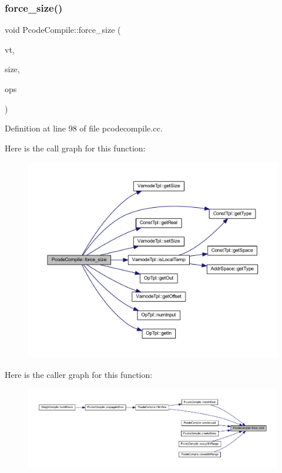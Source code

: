 \subsubsection{\texorpdfstring{force\_size()}{force\_size()}}
{\footnotesize\ttfamily void Pcode\+Compile\+::force\+\_\+size (\begin{DoxyParamCaption}\item[{\mbox{\hyperlink{class_varnode_tpl}{Varnode\+Tpl}} $\ast$}]{vt,  }\item[{const \mbox{\hyperlink{class_const_tpl}{Const\+Tpl}} \&}]{size,  }\item[{const vector$<$ \mbox{\hyperlink{class_op_tpl}{Op\+Tpl}} $\ast$ $>$ \&}]{ops }\end{DoxyParamCaption})\hspace{0.3cm}{\ttfamily [static]}}



Definition at line 98 of file pcodecompile.\+cc.

Here is the call graph for this function\+:
\nopagebreak
\begin{figure}[H]
\begin{center}
\leavevmode
\includegraphics[width=350pt]{class_pcode_compile_a620eb9c557b3c38ff57f958211065938_cgraph}
\end{center}
\end{figure}
Here is the caller graph for this function\+:
\nopagebreak
\begin{figure}[H]
\begin{center}
\leavevmode
\includegraphics[width=350pt]{class_pcode_compile_a620eb9c557b3c38ff57f958211065938_icgraph}
\end{center}
\end{figure}
\mbox{\label{class_pcode_compile_a94818a38c3750f1e25e83936a734b953}} 
